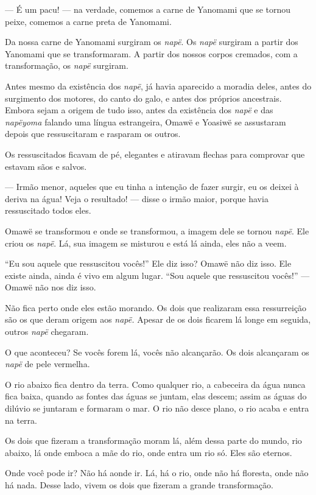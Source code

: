 --- É um pacu! --- na verdade, comemos a carne de Yanomami que se tornou
peixe, comemos a carne preta de Yanomami. 

Da nossa carne de Yanomami surgiram os \emph{napë}.
Os \emph{napë} surgiram a partir dos Yanomami que se transformaram. A partir dos nossos corpos cremados, com a transformação,
os \emph{napë} surgiram. 

Antes mesmo da existência dos \emph{napë}, já havia aparecido a moradia
deles, antes do surgimento dos motores, do canto do galo, e antes dos
próprios ancestrais. Embora sejam a origem de tudo isso, antes da
existência dos \emph{napë} e das \emph{napëyoma} falando uma língua
estrangeira, Omawë e Yoasiwë se assustaram depois que ressuscitaram e
rasparam os outros. 

Os ressuscitados ficavam de pé, elegantes e atiravam flechas para
comprovar que estavam sãos e salvos.

--- Irmão menor, aqueles que eu tinha a intenção de fazer surgir, eu os
deixei à deriva na água! Veja o resultado! --- disse o irmão maior,
porque havia ressuscitado todos eles. 

Omawë se transformou e onde se transformou, a imagem dele se
tornou \emph{napë}. Ele criou os \emph{napë}. Lá, sua imagem se misturou
e está lá ainda, eles não a veem. 

``Eu sou aquele que ressuscitou vocês!'' Ele diz isso? Omawë não diz
isso. Ele existe ainda, ainda é vivo em algum lugar. ``Sou aquele que
ressuscitou vocês!'' --- Omawë não nos diz isso. 

Não fica perto onde eles estão morando. Os dois que realizaram essa
ressurreição são os que deram origem aos \emph{napë.} Apesar de os dois
ficarem lá longe em seguida, outros \emph{napë} chegaram. 

O que aconteceu? Se vocês forem lá, vocês não alcançarão. Os dois
alcançaram os \emph{napë} de pele vermelha. 

O rio abaixo fica dentro da terra. Como qualquer rio, a cabeceira da
água nunca fica baixa, quando as fontes das águas se juntam, elas
descem; assim as águas do dilúvio se juntaram e formaram o mar. O rio
não desce plano, o rio acaba e entra na terra. 

Os dois que fizeram a transformação moram lá, além dessa parte do mundo,
rio abaixo, lá onde emboca a mãe do rio, onde entra um rio só. Eles são
eternos. 

Onde você pode ir? Não há aonde ir. Lá, há o rio, onde não há floresta,
onde não há nada. Desse lado, vivem os dois que fizeram a grande
transformação. 

